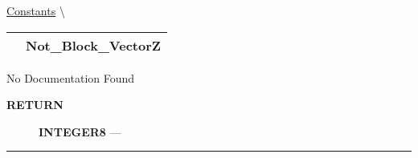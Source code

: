 \hypertarget{ecldoc:pbblas.constants.not_block_vectorz}{}
\hspace{0pt} \hyperlink{ecldoc:PBblas.Constants}{Constants} \textbackslash 

{\renewcommand{\arraystretch}{1.5}
\begin{tabularx}{\textwidth}{|>{\raggedright\arraybackslash}l|X|}
\hline
\hspace{0pt}\mytexttt{\color{red} } & \textbf{Not\_Block\_VectorZ} \\
\hline
\end{tabularx}
}

\par





No Documentation Found








\par
\begin{description}
\item [\colorbox{tagtype}{\color{white} \textbf{\textsf{RETURN}}}] \textbf{INTEGER8} --- 
\end{description}




\rule{\linewidth}{0.5pt}


